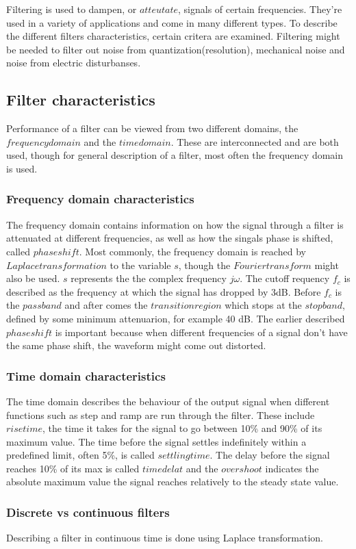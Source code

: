  Filtering is used to dampen, or $atteutate$, signals of certain frequencies.
They're used in a variety of applications and come in many different types. To
describe the different filters characteristics, certain critera are examined.
Filtering might be needed to filter out noise from quantization(resolution),
mechanical noise and noise from electric disturbanses.
\subsection*{Filter characteristics}
Performance of a filter can be viewed from two different domains, the $frequency
domain$ and the $time domain$. These are interconnected and are both used,
though for general description of a filter, most often the frequency domain is
used.
\subsubsection*{Frequency domain characteristics}
The frequency domain contains information on how the signal through a filter is
attenuated at different frequencies, as well as how the singals phase is
shifted, called $phase shift$. Most commonly, the frequency domain is reached by
$Laplace transformation$ to the variable $s$, though the $Fourier transform$
might also be used. $s$ represents the the complex frequency $j\omega$. The
cutoff requency $f_c$ is described as the frequency at which the signal has
dropped by 3dB. Before $f_c$ is the $passband$ and after comes the $transition
region$ which stops at the $stop band$, defined by some minimum attenuarion, for
example 40 dB. The earlier described $phase shift$ is important because when
different frequencies of a signal don't have the same phase shift, the waveform
might come out distorted.
\subsubsection*{Time domain characteristics}
The time domain describes the behaviour of the output signal when different
functions such as step and ramp are run through the filter. These include $rise
time$, the time it takes for the signal to go between 10\% and 90\% of its
maximum value. The time before the signal settles indefinitely within a
predefined limit, often 5\%, is called $settling time$. The delay before the
signal reaches 10\% of its max is called $time delat$ and the $overshoot$
indicates the absolute maximum value the signal reaches relatively to the steady
state value.
\subsubsection*{Discrete vs continuous filters}
Describing a filter in continuous time is done using Laplace transformation. 
